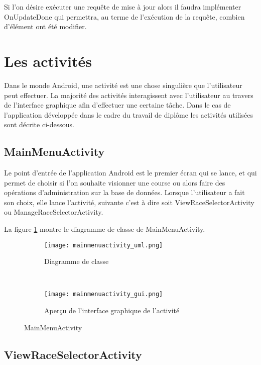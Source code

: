 Si l'on désire exécuter une requête de mise à jour alors il faudra implémenter OnUpdateDone qui permettra, au terme de l'exécution de la requête, combien d'élément ont été modifier.

\section{Les activités}

Dans le monde Android, une activité est une chose singulière que l'utilisateur peut effectuer. La majorité des activités interagissent avec l'utilisateur au travers de l'interface graphique afin d'effectuer une certaine tâche. \cite{android-activity} Dans le cas de l'application développée dans le cadre du travail de diplôme les activités utilisées sont décrite ci-dessous.

\subsection{MainMenuActivity}

Le point d'entrée de l'application Android est le premier écran qui se lance, et qui permet de choisir si l'on souhaite visionner une course ou alors faire des opérations d'administration sur la base de données. Lorsque l'utilisateur a fait son choix, elle lance l'activité, suivante c'est à dire soit ViewRaceSelectorActivity ou ManageRaceSelectorActivity.

La figure \ref{fig:mainmenuactivity_uml} montre le diagramme de classe de MainMenuActivity.

\begin{figure}[htb!]
    \centering
    \begin{subfigure}[htb]{0.49\textwidth}
		\texttt{[image: mainmenuactivity\_uml.png]} 
		\caption{Diagramme de classe}
		\label{fig:mainmenuactivity_uml}
    \end{subfigure}
    ~ %
    \begin{subfigure}[htb]{0.49\textwidth}
		\texttt{[image: mainmenuactivity\_gui.png]} 
		\caption{Aperçu de l'interface graphique de l'activité}
		\label{fig:mainmenuactivity_gui}
    \end{subfigure}
    \caption{MainMenuActivity}\label{fig:mainmenuactivity_fig}
\end{figure}

\subsection{ViewRaceSelectorActivity}

